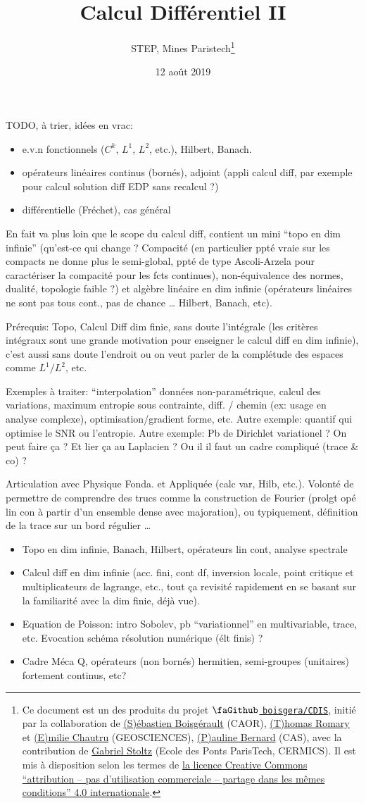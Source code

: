 \documentclass[french,]{article}
\title{Calcul Différentiel II}
\author{STEP, Mines Paristech\footnote{Ce document est un des produits du projet
  \href{https://github.com/}{\(\mbox{\faGithub}\)
  \texttt{boisgera/CDIS}}, initié par la collaboration de
  \href{mailto:sebastien.boisgerault@mines-paristech.fr}{(S)ébastien
  Boisgérault} (CAOR),
  \href{mailto:thomas.romary@mines-paristech.fr}{(T)homas Romary} et
  \href{mailto:emilie.chautru@mines-paristech.fr}{(E)milie Chautru}
  (GEOSCIENCES),
  \href{mailto:pauline.bernard@mines-paristech.fr}{(P)auline Bernard}
  (CAS), avec la contribution de
  \href{mailto:gabriel-stolz@mines-paristech.fr}{Gabriel Stoltz} (Ecole
  des Ponts ParisTech, CERMICS). Il est mis à disposition selon les
  termes de \href{http://creativecommons.org/licenses/by-nc-sa/}{la
  licence Creative Commons ``attribution -- pas d'utilisation
  commerciale -- partage dans les mêmes conditions'' 4.0
  internationale}.}}
\date{12 août 2019}
\begin{document}
\maketitle

{
\setcounter{tocdepth}{3}
\tableofcontents
}
TODO, à trier, idées en vrac:

\begin{itemize}
\item
  e.v.n fonctionnels (\(C^k\), \(L^1\), \(L^2\), etc.), Hilbert, Banach.
\item
  opérateurs linéaires continus (bornés), adjoint (appli calcul diff,
  par exemple pour calcul solution diff EDP sans recalcul ?)
\item
  différentielle (Fréchet), cas général
\end{itemize}

En fait va plus loin que le scope du calcul diff, contient un mini
``topo en dim infinie'' (qu'est-ce qui change ? Compacité (en
particulier ppté vraie sur les compacts ne donne plus le semi-global,
ppté de type Ascoli-Arzela pour caractériser la compacité pour les fcts
continues), non-équivalence des normes, dualité, topologie faible ?) et
algèbre linéaire en dim infinie (opérateurs linéaires ne sont pas tous
cont., pas de chance \ldots{} Hilbert, Banach, etc).

Prérequis: Topo, Calcul Diff dim finie, sans doute l'intégrale (les
critères intégraux sont une grande motivation pour enseigner le calcul
diff en dim infinie), c'est aussi sans doute l'endroit ou on veut parler
de la complétude des espaces comme \(L^1 / L^2\), etc.

Exemples à traiter: ``interpolation'' données non-paramétrique, calcul
des variations, maximum entropie sous contrainte, diff. / chemin (ex:
usage en analyse complexe), optimisation/gradient forme, etc. Autre
exemple: quantif qui optimise le SNR ou l'entropie. Autre exemple: Pb de
Dirichlet variationel ? On peut faire ça ? Et lier ça au Laplacien ? Ou
il il faut un cadre compliqué (trace \& co) ?

Articulation avec Physique Fonda. et Appliquée (calc var, Hilb, etc.).
Volonté de permettre de comprendre des trucs comme la construction de
Fourier (prolgt opé lin con à partir d'un ensemble dense avec
majoration), ou typiquement, définition de la trace sur un bord régulier
\ldots{}

\begin{itemize}
\item
  Topo en dim infinie, Banach, Hilbert, opérateurs lin cont, analyse
  spectrale
\item
  Calcul diff en dim infinie (acc. fini, cont df, inversion locale,
  point critique et multiplicateurs de lagrange, etc., tout ça revisité
  rapidement en se basant sur la familiarité avec la dim finie, déjà
  vue).
\item
  Equation de Poisson: intro Sobolev, pb ``variationnel'' en
  multivariable, trace, etc. Evocation schéma résolution numérique (élt
  finis) ?
\item
  Cadre Méca Q, opérateurs (non bornés) hermitien, semi-groupes
  (unitaires) fortement continus, etc?
\end{itemize}
\end{document}
